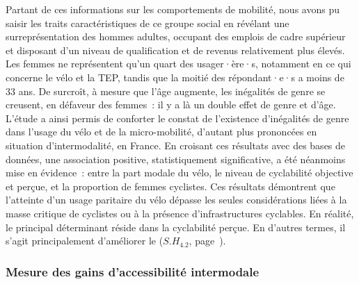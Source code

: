 \begin{refsegment}
Partant de ces informations sur les comportements de mobilité, nous avons pu saisir les traits caractéristiques de ce groupe social en révélant une surreprésentation des hommes adultes, occupant des emplois de cadre supérieur et disposant d’un niveau de qualification et de revenus relativement plus élevés. Les femmes ne représentent qu'un quart des usager·ère·s, notamment en ce qui concerne le vélo et la \acrshort{TEP}, tandis que la moitié des répondant·e·s a moins de 33 ans. De surcroît, à mesure que l’âge augmente, les inégalités de \gls{genre} se creusent, en défaveur des femmes~: il y a là un double effet de genre et d'âge. L’étude a ainsi permis de conforter le constat de l’existence d’inégalités de genre dans l’usage du vélo et de la micro-mobilité, d'autant plus prononcées en situation d'\gls{intermodalité}, en France. En croisant ces résultats avec des bases de données, une association positive, statistiquement significative, a été néanmoins mise en évidence~: entre la part modale du vélo, le niveau de cyclabilité objective et perçue, et la proportion de femmes cyclistes. Ces résultats démontrent que l’atteinte d’un usage paritaire du vélo dépasse les seules considérations liées à la masse critique de cyclistes ou à la présence d’infrastructures cyclables. En réalité, le principal déterminant réside dans la cyclabilité perçue. En d'autres termes, il s'agit principalement d'améliorer le  (\hyperref[sous-hypothese-4.2]{\(S.H_{4.2}\)}, page~\pageref{sous-hypothese-4.2}).%

\subsubsection*{Mesure des gains d'accessibilité intermodale
    \label{conclusion-generale:principaux-apports-chapitre5}
    }


\end{refsegment}
